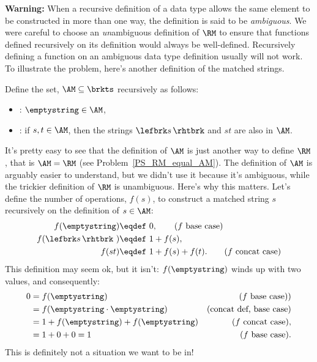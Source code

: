 \textbf{Warning:} When a recursive definition of a data type allows
the same element to be constructed in more than one way, the
definition is said to be \emph{ambiguous}.  We were careful to choose
an \emph{un}ambiguous definition of $\RM$ to ensure that functions
defined recursively on its definition would always be well-defined.
Recursively defining a function on an ambiguous data type
definition usually will not work.  To illustrate the problem, here's
another definition of the matched strings.

\iffalse Recursive definitions of tagged data types, where the tag
uniquely determines the rule used to construct an element, are guaranteed
to be unambiguous.
\fi

\begin{definition}
\label{AM_def}
Define the set, $\AM \subseteq \brkts$ recursively as follows:
\begin{itemize}

\item {}: $\emptystring \in \AM$,

\item {}: if $s,t \in \AM$, then
  the strings $\lefbrk s\, \rhtbrk$ and $st$ are also in $\AM$.
\end{itemize}
\end{definition}

It's pretty easy to see that the definition of $\AM$ is just another way
to define $\RM$, that is $\AM = \RM$ (see Problem~\ref{PS_RM_equal_AM}).
The definition of $\AM$ is arguably easier to understand, but we didn't
use it because it's ambiguous, while the trickier definition of $\RM$ is
unambiguous.  Here's why this matters.  Let's define the number of
operations, $f(s)$, to construct a matched string $s$ recursively on the
definition of $s \in \AM$:
\begin{align*}
  f(\emptystring)        & \eqdef\ 0, \tag{$f$ base case}\\
  f(\lefbrk s\,\rhtbrk\ ) & \eqdef\ 1+ f(s), \\
  f(st)                  & \eqdef\ 1+ f(s) +f(t).\tag{$f$ concat case}
\end{align*}
This definition may seem ok, but it isn't:
$f(\emptystring)$ winds up with two values, and consequently:
\begin{align*}
0 & = f(\emptystring) & \text{($f$ base case))}\\
  & = f(\emptystring \cdot \emptystring) & \text{(concat def, base case)} \\
                & = 1 + f(\emptystring) + f(\emptystring)
                      &  \text{($f$ concat case)},\\
                & = 1 + 0 + 0 = 1
                      & \text{($f$ base case)}.
\end{align*}
This is definitely not a situation we want to be in!


